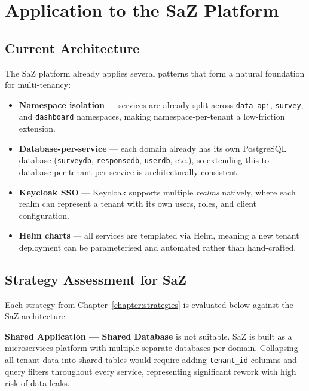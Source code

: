\chapter{Application to the SaZ Platform}
\label{chapter:application}

\section{Current Architecture}

The SaZ platform already applies several patterns that form a natural foundation for multi-tenancy:

\begin{itemize}
    \item \textbf{Namespace isolation} --- services are already split across \texttt{data-api}, \texttt{survey}, and \texttt{dashboard} namespaces, making namespace-per-tenant a low-friction extension.
    \item \textbf{Database-per-service} --- each domain already has its own PostgreSQL database (\texttt{surveydb}, \texttt{responsedb}, \texttt{userdb}, etc.), so extending this to database-per-tenant per service is architecturally consistent.
    \item \textbf{Keycloak SSO} --- Keycloak supports multiple \emph{realms} natively, where each realm can represent a tenant with its own users, roles, and client configuration.
    \item \textbf{Helm charts} --- all services are templated via Helm, meaning a new tenant deployment can be parameterised and automated rather than hand-crafted.
\end{itemize}

\section{Strategy Assessment for SaZ}

Each strategy from Chapter~\ref{chapter:strategies} is evaluated below against the SaZ architecture.

\textbf{Shared Application --- Shared Database} is not suitable. SaZ is built as a microservices platform with multiple separate databases per domain. Collapsing all tenant data into shared tables would require adding \texttt{tenant\_id} columns and query filters throughout every service, representing significant rework with high risk of data leaks.

